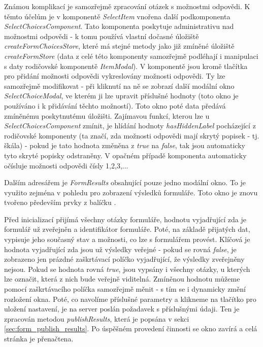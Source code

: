 			Známou komplikací je samozřejmě zpracování otázek s možnostmi odpovědi. K těmto účelům je v komponentě \textit{SelectItem} vnořena další podkomponenta \textit{SelectChoicesComponent}. Tato komponenta poskytuje administrativu nad možnostmi odpovědi - k tomu používá vlastní dočasné úložiště \textit{createFormChoicesStore}, které má stejné metody jako již zmíněné úložiště \textit{createFormStore} (data z celé této komponenty samozřejmě podléhají i manipulaci s daty rodičovské komponentě \textit{ItemModal}). V komponentě jsou kromě tlačítka pro přidání možnosti odpovědi vykreslovány možnosti odpovědi. Ty lze samozřejmě modifikovat - při kliknutí na ně se zobrazí další modální okno \textit{SelectChoiceModal}, ve kterém ji lze upravit příslušné hodnoty (toto okno je používáno i k přidávání těchto možností). Toto okno poté data předává zmíněnému poskytnutému úložišti. Zajímavou funkcí, kterou lze u \textit{SelectChoicesComponent} zmínit, je hlídání hodnoty \textit{hasHiddenLabel} pocházející z rodičovské komponenty (ta značí, zda možnosti odpovědi mají skrytý popisek - tj. škála) - pokud je tato hodnota změněna z \textit{true} na \textit{false}, tak jsou automaticky tyto skryté popisky odstraněny. V opačném případě komponenta automaticky očísluje možnosti odpovědi čísly 1,2,3,...
			
			Dalším adresářem je \textit{FormResults} obsahující pouze jedno modální okno. To je využito zejména v pohledu pro zobrazení výsledků formuláře. Toto okno je znovu tvořeno především prvky z balíčku . 
			
			Před inicializací přijímá všechny otázky formuláře, hodnotu vyjadřující zda je formulář už zveřejněn a identifikátor formuláře. Poté, na základě přijatých dat, vypisuje jeho současný stav a možnosti, co lze s formulářem provést. Klíčová je hodnota vyjadřující zda jsou už výsledky veřejné - pokud se rovná \textit{false}, je zobrazeno jen prázdné zaškrtávací políčko vyjadřující, že výsledky zveřejněny nejsou. Pokud se hodnota rovná \textit{true}, jsou vypsány i všechny otázky, u kterých lze označit, která z nich bude veřejně viditelná. Zmíněnou hodnotu můžeme pomocí zaškrtávacího políčka samozřejmě měnit - s tím se i dynamicky změní rozložení okna. Poté, co navolíme příslušné parametry a klikneme na tlačítko pro uložení nastavení, je na server poslán požadavek s příslušnými údaji. Ten je zpracován metodou \textit{publishResults}, která je popsána v sekci \ref{sec:form_publish_results}. Po úspěšném provedení činnosti se okno zavírá a celá stránka je přenačtena.
			
